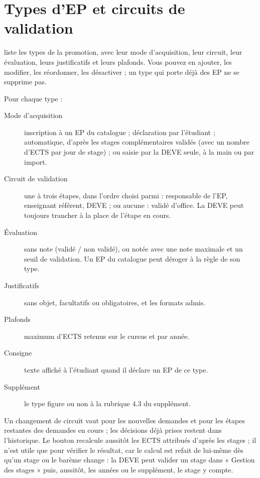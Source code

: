 \documentclass[11pt,a4paper]{article}
\begin{document}
\section{Types d'EP et circuits de validation}\label{sec:types}

 liste les types de la promotion, avec leur
mode d'acquisition, leur circuit, leur évaluation, leurs justificatifs et leurs plafonds.
Vous pouvez en ajouter, les modifier, les réordonner, les désactiver ; un type qui porte déjà
des EP ne se supprime pas.



Pour chaque type :
\begin{description}
  \item[Mode d'acquisition] inscription à un EP du catalogue ; déclaration par l'étudiant ;
    automatique, d'après les stages complémentaires validés (avec un nombre d'ECTS par jour de
    stage) ; ou saisie par la DEVE seule, à la main ou par import.
  \item[Circuit de validation] une à trois étapes, dans l'ordre choisi parmi : responsable de
    l'EP, enseignant référent, DEVE ; ou \og aucune\fg{} : validé d'office. La DEVE peut
    toujours trancher à la place de l'étape en cours.
  \item[Évaluation] sans note (validé / non validé), ou notée avec une note maximale et un seuil
    de validation. Un EP du catalogue peut déroger à la règle de son type.
  \item[Justificatifs] sans objet, facultatifs ou obligatoires, et les formats admis.
  \item[Plafonds] maximum d'ECTS retenus sur le cursus et par année.
  \item[Consigne] texte affiché à l'étudiant quand il déclare un EP de ce type.
  \item[Supplément] le type figure ou non à la rubrique 4.3 du supplément.
\end{description}

\begin{astuce}
Un changement de circuit vaut pour les nouvelles demandes et pour les étapes restantes des
demandes en cours ; les décisions déjà prises restent dans l'historique. Le bouton
 recalcule aussitôt les ECTS attribués d'après les
stages ; il n'est utile que pour vérifier le résultat, car le calcul est refait de lui-même dès
qu'un stage ou le barème change : la DEVE peut valider un stage dans « Gestion des stages » puis,
aussitôt, les années ou le supplément, le stage y compte.
\end{astuce}
\end{document}
